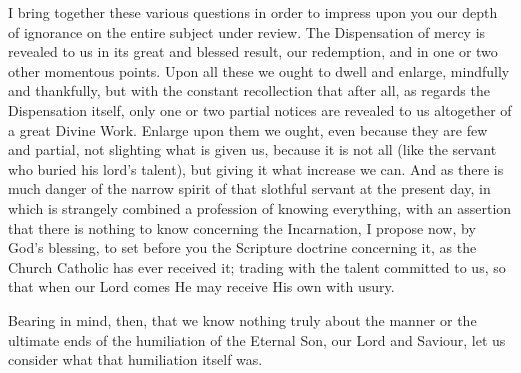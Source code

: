 I bring together these various questions in order to impress upon
you our depth of ignorance on the entire subject under review. The
Dispensation of mercy is revealed to us in its great and blessed
result, our redemption, and in one or two other momentous points. Upon
all these we ought to dwell and enlarge, mindfully and thankfully, but
with the constant recollection that after all, as regards the
Dispensation itself, only one or two partial notices are revealed to
us altogether of a great Divine Work. Enlarge upon them we ought, even
because they are few and partial, not slighting what is given us,
because it is not all (like the servant who buried his lord's talent),
but giving it what increase we can. And as there is much danger of the
narrow spirit of that slothful servant at the present day, in which is
strangely combined a profession of knowing everything, with an
assertion that there is nothing to know concerning the Incarnation, I
propose now, by God's blessing, to set before you the Scripture
doctrine concerning it, as the Church Catholic has ever received it;
trading with the talent committed to us, so that when our Lord comes
He may receive His own with usury.

Bearing in mind, then, that we know nothing truly about the manner
or the ultimate ends of the humiliation of the Eternal Son, our Lord
and Saviour, let us consider what that humiliation itself was.

